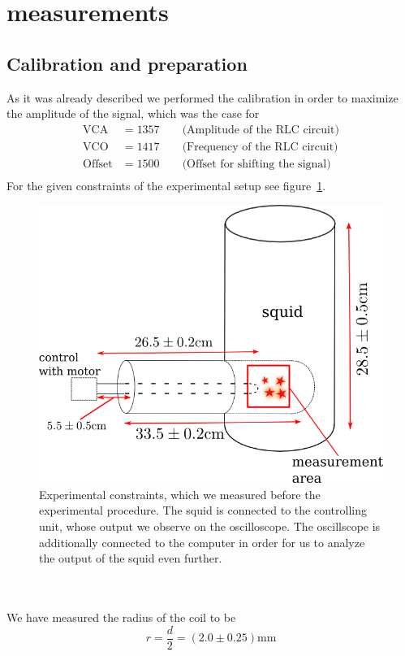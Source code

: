 \section{measurements}
\subsection{Calibration and preparation}
As it was already described we performed the calibration in order to maximize the amplitude of the
signal, which was the case for \\
\begin{align*}
     \mathrm{VCA} &= 1357 \qquad \text{(Amplitude of the RLC circuit)}\\
     \mathrm{VCO} &= 1417 \qquad\text{(Frequency of the RLC circuit)}\\ 
     \mathrm{Offset} &= 1500 \qquad\text{(Offset for shifting the signal)}\\
\end{align*}
For the given constraints of the experimental setup see figure~\ref{fig:setup1}.
\begin{figure}[htpb]
    \centering
    \includegraphics[width=0.8\linewidth]{figures/setup1}
    \caption{Experimental constraints, which we measured before the experimental procedure. The squid
    is connected to the controlling unit, whose output we observe on the oscilloscope. The oscillscope
    is additionally connected to the computer in order for us to analyze the output of the squid even further.}
    \label{fig:setup1}
\end{figure}
\\\\
We have measured the radius of the coil to be 
\begin{equation}
r = \frac{d}{2} = (2.0 \pm 0.25) \mathrm{mm}
\end{equation}
